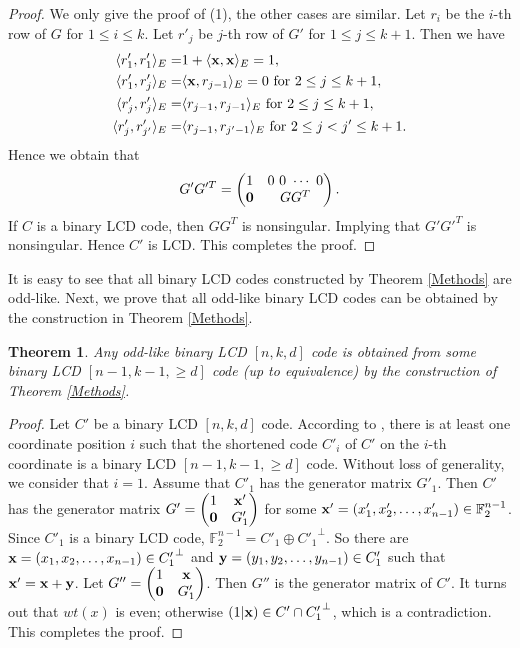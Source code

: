 \documentclass[12pt,twoside]{article}
\newcommand{\F}{\mathbb{F}}
\theoremstyle{plain}
\newtheorem{theorem}{Theorem}[section]
\theoremstyle{definition}
\theoremstyle{remark}
\begin{document}
\begin{proof}
We only give the proof of (1), the other cases are similar.
Let $r_i$ be the $i$-th row of $G$ for $1\leq i\leq k$. Let $r'_j$ be $j$-th row of $G'$ for $1\leq j\leq k+1$.
Then we have
\begin{align*}
  \langle r'_1, r'_1\rangle_E  =&1+\langle {\bf x}, {\bf x}\rangle_E=1, \\
  \langle r'_1, r'_j\rangle_E  =&\langle {\bf x}, r_{j-1}\rangle_E=0\ {\rm for}\ 2\leq j\leq k+1,\\
  \langle r'_j, r'_j\rangle_E  =&\langle r_{j-1}, r_{j-1}\rangle_E\ {\rm for}\ 2\leq j\leq k+1,\\
  \langle r'_j, r'_{j'}\rangle_E  =&\langle r_{j-1}, r_{j'-1}\rangle_E\ {\rm for}\ 2\leq j<j'\leq k+1.
\end{align*}
Hence we obtain that
$$
G'G'^{T}=\begin{pmatrix}
1 & 0\ 0\ \cdots\ 0 \\
\textbf 0 & GG^T
\end{pmatrix}.
$$
If $C$ is a binary LCD code, then $GG^{T}$ is nonsingular. Implying that
$G'G'^{T}$ is nonsingular. Hence $C'$ is LCD. This completes the proof.
\end{proof}

It is easy to see that all binary LCD codes constructed by Theorem \ref{Methods} are odd-like.
Next, we prove that all odd-like binary LCD codes can be obtained by
the construction in Theorem \ref{Methods}.

\begin{theorem}
Any odd-like binary LCD $[n,k,d]$ code is obtained from some binary LCD $[n-1,k-1,\geq d]$ code (up to equivalence) by the construction of Theorem \ref{Methods}.
\end{theorem}

\begin{proof}
Let $C'$ be a binary LCD $[n,k,d]$ code. According to \cite[Propsition 3]{B-LCD-40}, there is at least one coordinate position $i$ such that the shortened code $C'_i$ of $C'$ on the $i$-th coordinate is a binary LCD $[n-1,k-1,\geq d]$ code. Without loss of generality, we consider that $i=1$.
Assume that $C'_1$ has the generator matrix $G'_1$. Then $C'$ has the generator matrix
$G'=\begin{pmatrix}
1 & {\bf x'} \\
\textbf 0 & G'_1
\end{pmatrix}$
for some ${\bf x'}=(x'_1,x'_2,\ldots,x'_{n-1})\in \F_2^{n-1}$.
Since $C'_1$ is a binary LCD code, $\F_2^{n-1}=C'_1\oplus {C'_1}^\perp$.
So there are ${\bf x}=(x_1,x_2,\ldots,x_{n-1})\in {C'_1}^\perp$ and ${\bf y}=(y_1,y_2,\ldots,y_{n-1})\in C'_1$ such that ${\bf x'}={\bf x}+{\bf y}$.
Let $G''=\begin{pmatrix}
1 & {\bf x} \\
\textbf 0 & G'_1
\end{pmatrix}$.
Then $G''$ is the generator matrix of $C'$.
It turns out that $wt(x)$ is even; otherwise $(1|{\bf x})\in C'\cap {C'_1}^\perp$, which is a contradiction.
This completes the proof.
\end{proof}
\end{document}
